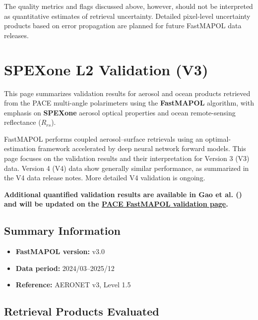 \documentclass[
  11pt,
  letterpaper,
]{scrreprt}
\providecommand{\tightlist}{%
  \setlength{\itemsep}{0pt}\setlength{\parskip}{0pt}}
\begin{document}
The quality metrics and flags discussed above, however, should not be
interpreted as quantitative estimates of retrieval uncertainty. Detailed
pixel-level uncertainty products based on error propagation are planned
for future FastMAPOL data releases.


\chapter{SPEXone L2 Validation (V3)}\label{spexone-l2-validation-v3}

This page summarizes validation results for aerosol and ocean products
retrieved from the PACE multi-angle polarimeters using the
\textbf{FastMAPOL} algorithm, with emphasis on \textbf{SPEXone} aerosol
optical properties and ocean remote-sensing reflectance (\(R_{rs}\)).

FastMAPOL performs coupled aerosol--surface retrievals using an
optimal-estimation framework accelerated by deep neural network forward
models. This page focuses on the validation results and their
interpretation for Version 3 (V3) data. Version 4 (V4) data show
generally similar performance, as summarized in the V4 data release
notes. More detailed V4 validation is ongoing.

\textbf{Additional quantified validation results are available in Gao et
al. () and will be updated on the
\href{https://pace.oceansciences.org/pace_fastmapol.htm}{PACE FastMAPOL
validation page}.}

\section{Summary Information}\label{summary-information}

\begin{itemize}
\tightlist
\item
  \textbf{FastMAPOL version:} v3.0\\
\item
  \textbf{Data period:} 2024/03--2025/12\\
\item
  \textbf{Reference:} AERONET v3, Level 1.5
\end{itemize}

\section{Retrieval Products
Evaluated}\label{retrieval-products-evaluated}
\end{document}
